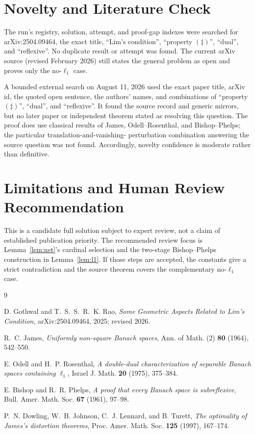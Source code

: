 \documentclass[11pt]{article}
\begin{document}
\section*{Novelty and Literature Check}

The run's registry, solution, attempt, and proof-gap indexes were searched for
arXiv:2504.09464, the exact title, ``Lim's condition'',
``property \((\ddagger)\)'', ``dual'', and ``reflexive''.  No duplicate result
or attempt was found.  The current arXiv source (revised February 2026) still
states the general problem as open and proves only the no-\(\ell_1\) case.

A bounded external search on August 11, 2026 used the exact paper title,
arXiv id, the quoted open sentence, the authors' names, and combinations of
``property \((\ddagger)\)'', ``dual'', and ``reflexive''.  It found the source
record and generic mirrors, but no later paper or independent theorem stated
as resolving this question.  The proof does use classical results of James,
Odell--Rosenthal, and Bishop--Phelps; the particular translation-and-vanishing-
perturbation combination answering the source question was not found.
Accordingly, novelty confidence is moderate rather than definitive.

\section*{Limitations and Human Review Recommendation}

This is a candidate full solution subject to expert review, not a claim of
established publication priority.  The recommended review focus is
Lemma~\ref{lem:net}'s cardinal selection and the two-stage Bishop--Phelps
construction in Lemma~\ref{lem:l1}.  If those steps are accepted, the
constants give a strict contradiction and the source theorem covers the
complementary no-\(\ell_1\) case.

\small
\begin{thebibliography}{9}

D. Gothwal and T.~S.~S.~R.~K. Rao,
\emph{Some Geometric Aspects Related to Lim's Condition},
arXiv:2504.09464, 2025; revised 2026.

R.~C. James,
\emph{Uniformly non-square Banach spaces},
Ann. of Math. (2) \textbf{80} (1964), 542--550.

E. Odell and H.~P. Rosenthal,
\emph{A double-dual characterization of separable Banach spaces containing
\(\ell_1\)},
Israel J. Math. \textbf{20} (1975), 375--384.

E. Bishop and R.~R. Phelps,
\emph{A proof that every Banach space is subreflexive},
Bull. Amer. Math. Soc. \textbf{67} (1961), 97--98.

P.~N. Dowling, W.~B. Johnson, C.~J. Lennard, and B. Turett,
\emph{The optimality of James's distortion theorems},
Proc. Amer. Math. Soc. \textbf{125} (1997), 167--174.

\end{thebibliography}
\end{document}
